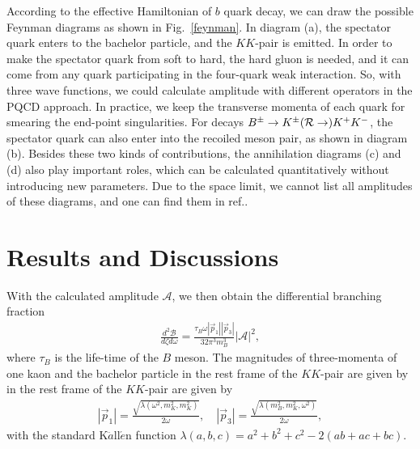 \documentclass[11pt]{article}
\begin{document}
According to the effective Hamiltonian of $b$ quark decay, we can draw the possible Feynman diagrams as shown in Fig.~\ref{feynman}. In diagram (a), the spectator quark enters to the bachelor particle, and the $KK$-pair is emitted. In order to make the spectator quark from soft to hard, the hard gluon is needed, and it can come from any quark participating in the four-quark weak interaction. So, with three wave functions, we could calculate amplitude with different operators in the PQCD approach. In practice, we keep the transverse momenta of each quark for smearing the end-point singularities. For decays $B^\pm\to  K^\pm({\cal R}\to) K^+ K^-$, the spectator quark can also enter into the recoiled meson pair, as shown in diagram (b). Besides these two kinds of contributions, the annihilation diagrams (c) and (d) also play important roles, which can be calculated quantitatively without introducing new parameters. Due to the space limit, we cannot list all amplitudes of these diagrams, and one can find them in ref.\cite{Zou:2020atb}.

\section{Results and Discussions} \label{results}
With the calculated amplitude $\mathcal{A}$, we then obtain the differential branching fraction
\begin{eqnarray}
\frac{d^2\mathcal{B}}{d \zeta d\omega}=\frac{\tau_B\omega|\vec{p}_1||\vec{p}_3|}{32\pi^3 m_{B}^3}|\mathcal{A}|^2,
\end{eqnarray}
where $\tau_B$ is the life-time of the $B$ meson. The magnitudes of three-momenta of one kaon and the bachelor particle in the rest frame of the $KK$-pair are given by in the rest frame of the $KK$-pair are given by
\begin{eqnarray}
|\vec{p}_1|=\frac{\sqrt{\lambda(\omega^2,m_K^2,m_K^2)}}{2\omega}, \quad
|\vec{p}_3|=\frac{\sqrt{\lambda(m_{B}^2,m_K^2,\omega^2)}}{2\omega},
\end{eqnarray}
with the standard K$\ddot{a}$ll$\acute{e}$n function $\lambda (a,b,c)= a^2+b^2+c^2-2(ab+ac+bc)$.
\end{document}
